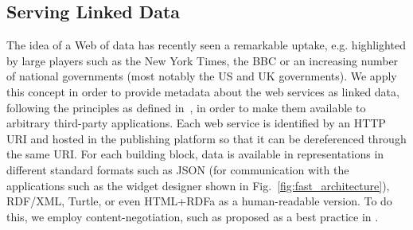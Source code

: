 
\subsection{Serving Linked Data} %
\label{sub:linked_data}

The idea of a Web of data has recently seen a remarkable uptake, e.g. highlighted by large players such as the New York Times, the BBC or an increasing number of national governments (most notably the US and UK governments).
We apply this concept in order to provide metadata about the web services as linked data, following the principles as defined in~\cite{bizer_ijswis2009}, in order to make them available to arbitrary third-party applications. Each web service is identified by an HTTP URI and hosted in the publishing platform so that it can be dereferenced through the same URI. For each building block, data is available in representations in different standard formats such as JSON (for communication with the applications such as the widget designer shown in Fig.~\ref{fig:fast_architecture}), RDF/XML, Turtle, or even HTML+RDFa as a human-readable version. To do this, we employ content-negotiation, such as proposed as a best practice in \cite{sauermann2008cool_uris}.

